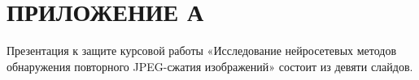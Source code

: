 \chapter*{ПРИЛОЖЕНИЕ А}
{}

Презентация к защите курсовой работы «Исследование нейросетевых методов обнаружения повторного JPEG-сжатия изображений» состоит из девяти слайдов.


